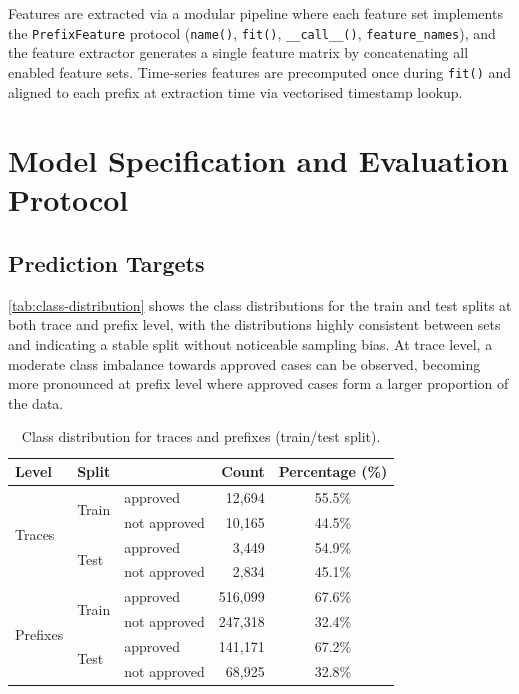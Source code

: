 \documentclass[runningheads]{llncs}
\begin{document}
Features are extracted via a modular pipeline where each feature set implements the
\texttt{PrefixFeature} protocol (\texttt{name()}, \texttt{fit()},
\texttt{\_\_call\_\_()}, \texttt{feature\_names}), and the feature extractor
generates a single feature matrix by concatenating all enabled feature sets.
Time-series features are precomputed once during \texttt{fit()} and aligned
to each prefix at extraction time via vectorised timestamp lookup.

\section{Model Specification and Evaluation Protocol}
\label{sec:models}

\subsection{Prediction Targets}
\label{sec:tasks}
\autoref{tab:class-distribution} shows the class distributions for the train and test splits at both trace and prefix level, with the distributions highly consistent between sets and indicating a stable split without noticeable sampling bias. At trace level, a moderate class imbalance towards approved cases can be observed, becoming more pronounced at prefix level where approved cases form a larger proportion of the data.

\begin{table}[H]
    \centering
    \caption{Class distribution for traces and prefixes (train/test split).}
    \label{tab:class-distribution}
    \begin{tabularx}{0.65\textwidth}{l l l r c}
        \toprule
        Level & Split & & Count & Percentage (\%) \\
        \midrule
        \multirow{4}{*}{Traces}
         & \multirow{2}{*}{Train} & approved & 12,694 & 55.5\% \\
         & & not approved & 10,165 & 44.5\% \\
         \cmidrule(lr){2-5}
         & \multirow{2}{*}{Test} & approved & 3,449 & 54.9\% \\
         & & not approved & 2,834 & 45.1\% \\
        \midrule
        \multirow{4}{*}{Prefixes}
         & \multirow{2}{*}{Train} & approved & 516,099 & 67.6\% \\
         & & not approved & 247,318 & 32.4\%  \\
         \cmidrule(lr){2-5}
         & \multirow{2}{*}{Test} & approved & 141,171 & 67.2\% \\
         & & not approved & 68,925 & 32.8\% \\
         \bottomrule
    \end{tabularx}
\end{table}
\end{document}
